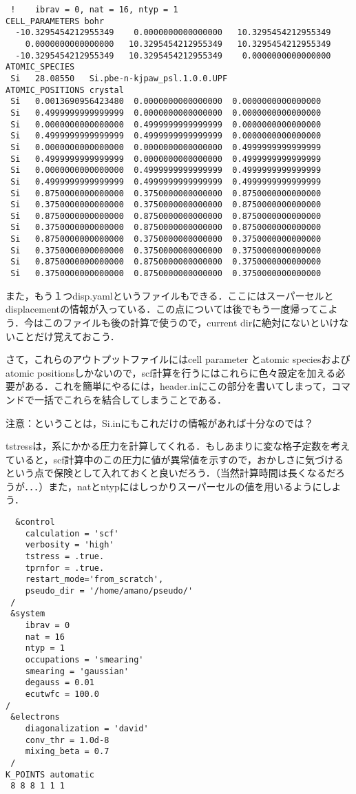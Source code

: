 \documentclass[a4j]{jarticle}
\begin{document}
\begin{lstlisting}
 !    ibrav = 0, nat = 16, ntyp = 1
CELL_PARAMETERS bohr
  -10.3295454212955349    0.0000000000000000   10.3295454212955349
    0.0000000000000000   10.3295454212955349   10.3295454212955349
  -10.3295454212955349   10.3295454212955349    0.0000000000000000
ATOMIC_SPECIES
 Si   28.08550   Si.pbe-n-kjpaw_psl.1.0.0.UPF
ATOMIC_POSITIONS crystal
 Si   0.0013690956423480  0.0000000000000000  0.0000000000000000
 Si   0.4999999999999999  0.0000000000000000  0.0000000000000000
 Si   0.0000000000000000  0.4999999999999999  0.0000000000000000
 Si   0.4999999999999999  0.4999999999999999  0.0000000000000000
 Si   0.0000000000000000  0.0000000000000000  0.4999999999999999
 Si   0.4999999999999999  0.0000000000000000  0.4999999999999999
 Si   0.0000000000000000  0.4999999999999999  0.4999999999999999
 Si   0.4999999999999999  0.4999999999999999  0.4999999999999999
 Si   0.8750000000000000  0.3750000000000000  0.8750000000000000
 Si   0.3750000000000000  0.3750000000000000  0.8750000000000000
 Si   0.8750000000000000  0.8750000000000000  0.8750000000000000
 Si   0.3750000000000000  0.8750000000000000  0.8750000000000000
 Si   0.8750000000000000  0.3750000000000000  0.3750000000000000
 Si   0.3750000000000000  0.3750000000000000  0.3750000000000000
 Si   0.8750000000000000  0.8750000000000000  0.3750000000000000
 Si   0.3750000000000000  0.8750000000000000  0.3750000000000000
\end{lstlisting}

また，もう１つdisp.yamlというファイルもできる．ここにはスーパーセルとdisplacementの情報が入っている．この点については後でもう一度帰ってこよう．今はこのファイルも後の計算で使うので，current dirに絶対にないといけないことだけ覚えておこう．



さて，これらのアウトプットファイルにはcell parameter とatomic speciesおよびatomic positionsしかないので，scf計算を行うにはこれらに色々設定を加える必要がある．これを簡単にやるには，header.inにこの部分を書いてしまって，コマンドで一括でこれらを結合してしまうことである．

注意：ということは，Si.inにもこれだけの情報があれば十分なのでは？

tstressは，系にかかる圧力を計算してくれる．もしあまりに変な格子定数を考えていると，scf計算中のこの圧力に値が異常値を示すので，おかしさに気づけるという点で保険として入れておくと良いだろう．（当然計算時間は長くなるだろうが．．．）また，natとntypにはしっかりスーパーセルの値を用いるようにしよう．
\begin{lstlisting}
  &control
    calculation = 'scf'
    verbosity = 'high'
    tstress = .true.
    tprnfor = .true.
    restart_mode='from_scratch',
    pseudo_dir = '/home/amano/pseudo/'
 /
 &system
    ibrav = 0
    nat = 16
    ntyp = 1
    occupations = 'smearing'
    smearing = 'gaussian'
    degauss = 0.01
    ecutwfc = 100.0
/
 &electrons
    diagonalization = 'david'
    conv_thr = 1.0d-8
    mixing_beta = 0.7
 /
K_POINTS automatic
 8 8 8 1 1 1
\end{lstlisting}
\end{document}
